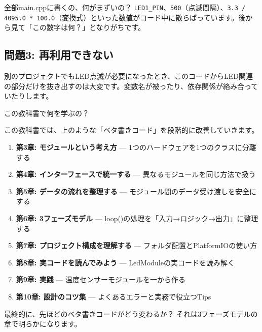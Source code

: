 \begin{qabox}{全部main.cppに書くの、何がまずいの？}
\texttt{LED1\_PIN}、\texttt{500}（点滅間隔）、\texttt{3.3 / 4095.0 * 100.0}（変換式）といった数値がコード中に散らばっています。後から見て「この数字は何？」となりがちです。

\subsection{問題3: 再利用できない}

別のプロジェクトでもLED点滅が必要になったとき、このコードからLED関連の部分だけを抜き出すのは大変です。変数名が被ったり、依存関係が絡み合っていたりします。

\end{qabox}

\begin{qabox}{この教科書で何を学ぶの？}

この教科書では、上のような「ベタ書きコード」を段階的に改善していきます。

\begin{enumerate}
  \item \textbf{第3章: モジュールという考え方} — 1つのハードウェアを1つのクラスに分離する
  \item \textbf{第4章: インターフェースで統一する} — 異なるモジュールを同じ方法で扱う
  \item \textbf{第5章: データの流れを整理する} — モジュール間のデータ受け渡しを安全にする
  \item \textbf{第6章: 3フェーズモデル} — loop()の処理を「入力→ロジック→出力」に整理する
  \item \textbf{第7章: プロジェクト構成を理解する} — フォルダ配置とPlatformIOの使い方
  \item \textbf{第8章: 実コードを読んでみよう} — LedModuleの実コードを読み解く
  \item \textbf{第9章: 実践} — 温度センサーモジュールを一から作る
  \item \textbf{第10章: 設計のコツ集} — よくあるエラーと実務で役立つTips
\end{enumerate}

最終的に、先ほどのベタ書きコードがどう変わるか？ それは3フェーズモデルの章で明らかになります。

\end{qabox}
